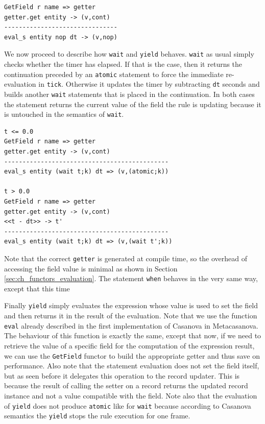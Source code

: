 \begin{lstlisting}
GetField r name => getter
getter.get entity -> (v,cont)
-------------------------------
eval_s entity nop dt -> (v,nop)
\end{lstlisting}

We now proceed to describe how \texttt{wait} and \texttt{yield} behaves. \texttt{wait} as usual simply checks whether the timer has elapsed. If that is the case, then it returns the continuation preceded by an \texttt{atomic} statement to force the immediate re-evaluation in \texttt{tick}. Otherwise it updates the timer by subtracting \texttt{dt} seconds and builds another \texttt{wait} statements that is placed in the continuation. In both cases the statement returns the current value of the field the rule is updating because it is untouched in the semantics of \texttt{wait}.

\begin{lstlisting}
t <= 0.0
GetField r name => getter
getter.get entity -> (v,cont)
---------------------------------------------
eval_s entity (wait t;k) dt => (v,(atomic;k))

t > 0.0
GetField r name => getter
getter.get entity -> (v,cont)
<<t - dt>> -> t'
---------------------------------------------
eval_s entity (wait t;k) dt => (v,(wait t';k))
\end{lstlisting}

\noindent
Note that the correct \texttt{getter} is generated at compile time, so the overhead of accessing the field value is minimal as shown in Section \ref{sec:ch_functors_evaluation}. The statement \texttt{when} behaves in the very same way, except that this time 


Finally \texttt{yield} simply evaluates the expression whose value is used to set the field and then returns it in the result of the evaluation. Note that we use the function \texttt{eval} already described in the first implementation of Casanova in Metacasanova. The behaviour of this function is exactly the same, except that now, if we need to retrieve the value of a specific field for the computation of the expression result, we can use the \texttt{GetField} functor to build the appropriate getter and thus save on performance. Also note that the statement evaluation does not set the field itself, but as seen before it delegates this operation to the record updater. This is because the result of calling the setter on a record returns the updated record instance and not a value compatible with the field. Note also that the evaluation of \texttt{yield} does not produce \texttt{atomic} like for \texttt{wait} because according to Casanova semantics the \texttt{yield} stops the rule execution for one frame.

